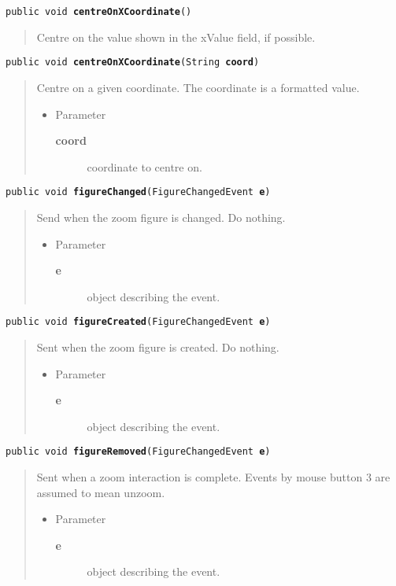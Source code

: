 \documentclass[twoside,11pt,nolof]{starlink}
\providecommand{\method}[1]{\texttt{#1}}
\newenvironment{desc}{\begin{quote}}{\end{quote}}
\begin{document}
\method{public void \textbf{centreOnXCoordinate}()\label{l140}\label{l141}}
\begin{desc}Centre on the value shown in the xValue field, if possible.
\end{desc}

\method{public void \textbf{centreOnXCoordinate}(\texttt{String} \textbf{coord})\label{l142}\label{l143}}
\begin{desc}Centre on a given coordinate. The coordinate is a formatted
 value.
\begin{itemize}
\item{Parameter
  \begin{description}
   \item[\textbf{coord}]{coordinate to centre on.}
  \end{description}}
\end{itemize}
\end{desc}

\method{public void \textbf{figureChanged}(\texttt{FigureChangedEvent} \textbf{e})\label{l144}\label{l145}}
\begin{desc}Send when the zoom figure is changed. Do nothing.
\begin{itemize}
\item{Parameter
  \begin{description}
   \item[\textbf{e}]{object describing the event.}
  \end{description}}
\end{itemize}
\end{desc}

\method{public void \textbf{figureCreated}(\texttt{FigureChangedEvent} \textbf{e})\label{l146}\label{l147}}
\begin{desc}Sent when the zoom figure is created. Do nothing.
\begin{itemize}
\item{Parameter
  \begin{description}
   \item[\textbf{e}]{object describing the event.}
  \end{description}}
\end{itemize}
\end{desc}

\method{public void \textbf{figureRemoved}(\texttt{FigureChangedEvent} \textbf{e})\label{l148}\label{l149}}
\begin{desc}Sent when a zoom interaction is complete. Events by mouse
 button 3 are assumed to mean unzoom.
\begin{itemize}
\item{Parameter
  \begin{description}
   \item[\textbf{e}]{object describing the event.}
  \end{description}}
\end{itemize}
\end{desc}
\end{document}
